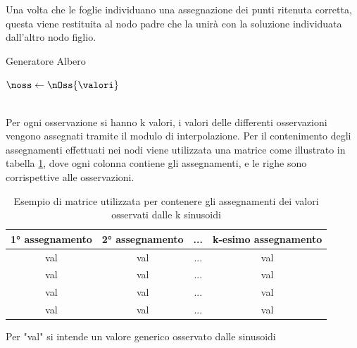 \documentclass[a4paper,12pt]{report}
\begin{document}
  Una volta che le foglie individuano una assegnazione dei punti ritenuta corretta, questa viene restituita al nodo padre che la unirà con la soluzione individuata dall'altro nodo figlio.
  \begin{algorithm}
  \caption{Generatore Albero}\label{alg:genera_albero}
  $\noss \leftarrow \nOss{\valori}$ \\
  \Return {} \\

  \end{algorithm}

  Per ogni osservazione si hanno k valori, i valori delle differenti osservazioni vengono assegnati tramite il modulo di interpolazione. Per il contenimento degli assegnamenti effettuati nei nodi viene utilizzata una matrice come illustrato in tabella \ref{tab:osservazioni}, dove ogni colonna contiene gli assegnamenti, e le righe sono corrispettive alle osservazioni.

  \begin{table}[H]
    \caption{Esempio di matrice utilizzata per contenere gli assegnamenti dei valori osservati dalle k sinusoidi }
    \label{tab:osservazioni}
    \center
      \begin{tabular}{cccc}
        \toprule
        {\ang{1} assegnamento} & {\ang{2} assegnamento} & {...} & {k-esimo assegnamento}\\
        \midrule
         val & val & ... & val \\
         val & val & ... & val  \\
         val & val & ... & val \\
         val & val & ... & val \\
        \bottomrule
      \end{tabular}
      \begin{minipage}{13cm}
        \small
        \centering
        Per "val" si intende un valore generico osservato dalle sinusoidi
      \end{minipage}
  \end{table}
\end{document}
